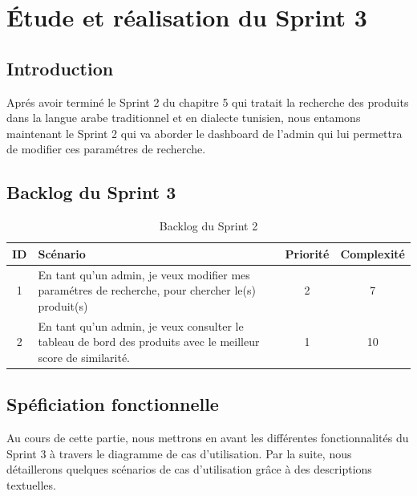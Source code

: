 \chapter{Étude et réalisation du Sprint 3}
\localtableofcontents
\newpage
\section{Introduction}
\noindent
Aprés avoir terminé le Sprint 2 du chapitre 5 qui tratait la recherche des produits dans la langue arabe traditionnel et en dialecte tunisien, nous entamons maintenant le Sprint 2 qui va aborder le dashboard de l'admin qui lui permettra de modifier ces paramétres de recherche.

\section{Backlog du Sprint 3}
\begin{table}[H]
	\centering

	\begin{tabularx}{\textwidth}{|c|X|c|c|}
		\hline
		\rowcolor{blue!20}
		\textbf{ID} & \textbf{Scénario}                                                                                            & \textbf{Priorité} & \textbf{Complexité} \\ \hline
		1           & En tant qu'un admin, je veux modifier mes paramétres de recherche, pour chercher le(s) produit(s)            & 2                 & 7                   \\ \hline

		2           & En tant qu'un admin, je veux consulter le tableau de bord des produits avec le meilleur score de similarité. & 1                 & 10                  \\ \hline
	\end{tabularx}
	\caption{Backlog du Sprint 2}
	\label{tab:sprint3}
\end{table}

\section{Spéficiation fonctionnelle}
\noindent
Au cours de cette partie, nous mettrons en avant les différentes fonctionnalités du
Sprint 3 à travers le diagramme de cas d'utilisation. Par la suite, nous détaillerons quelques
scénarios de cas d'utilisation grâce à des descriptions textuelles.

